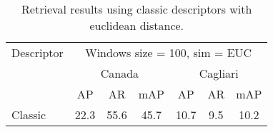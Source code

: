 \documentclass[12pt,italian]{article}
\begin{document}


\begin{table}
	\centering
	\caption{Retrieval results using classic descriptors with euclidean distance.}
	\label{tab:retrievalEUC}
	\begin{tabular}{lcccccc}
		\toprule
		Descriptor &     \multicolumn{6}{c}{Windows size = 100, sim = EUC}     \\
		           & \multicolumn{3}{c}{Canada} & \multicolumn{3}{c}{Cagliari} \\
		           &  AP  &  AR  &     mAP      &  AP  & AR  &       mAP       \\ \midrule
		Classic    & 22.3 & 55.6 &     45.7     & 10.7 & 9.5 &      10.2       \\ \bottomrule
	\end{tabular}
\end{table}

 \pagebreak 
\end{document}
